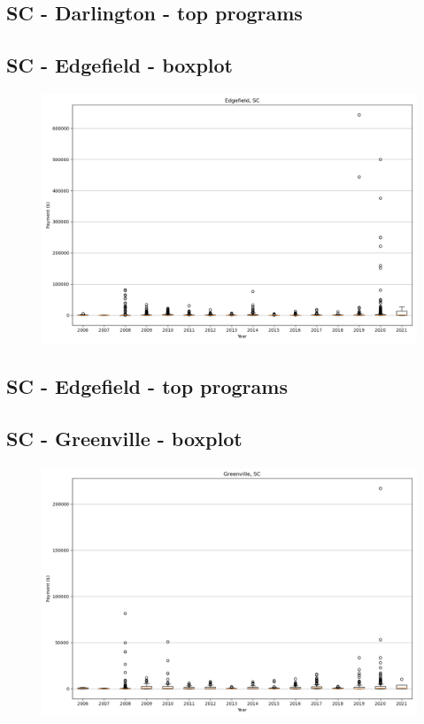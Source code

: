 \subsection*{SC - Darlington - top programs}

\newpage
\subsection*{SC - Edgefield - boxplot}
\begin{figure}[h]
\centering
\includegraphics[width=7in]{../output/boxplots/counties/Edgefield-SC_boxplot.png}
\end{figure}


\subsection*{SC - Edgefield - top programs}

\newpage
\subsection*{SC - Greenville - boxplot}
\begin{figure}[h]
\centering
\includegraphics[width=7in]{../output/boxplots/counties/Greenville-SC_boxplot.png}
\end{figure}


